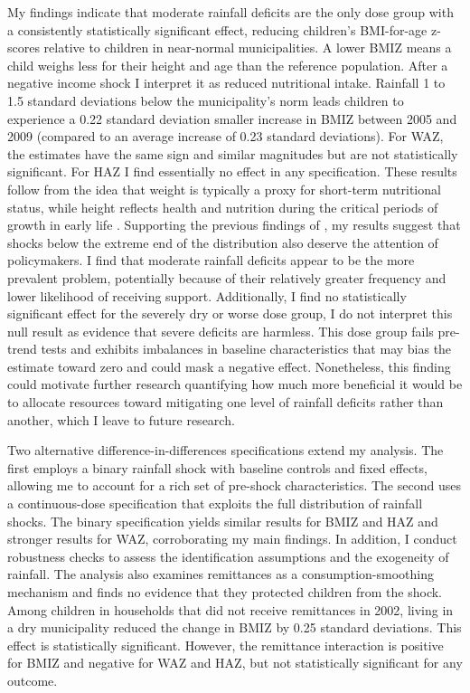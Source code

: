 \documentclass[12pt]{article}
\begin{document}
My findings indicate that moderate rainfall deficits are the only dose group with a consistently statistically significant effect, reducing children's BMI-for-age z-scores relative to children in near-normal municipalities. A lower BMIZ means a child weighs less for their height and age than the reference population. After a negative income shock I interpret it as reduced nutritional intake. Rainfall 1 to 1.5 standard deviations below the municipality's norm leads children to experience a 0.22 standard deviation smaller increase in BMIZ between 2005 and 2009 (compared to an average increase of 0.23 standard deviations). For WAZ, the estimates have the same sign and similar magnitudes but are not statistically significant. For HAZ I find essentially no effect in any specification. These results follow from the idea that weight is typically a proxy for short-term nutritional status, while height reflects health and nutrition during the critical periods of growth in early life \parencite{currieEarlyLifeHealthAdult2013}. Supporting the previous findings of \textcite{almondChildhoodCircumstancesAdult2018}, my results suggest that shocks below the extreme end of the distribution also deserve the attention of policymakers. I find that moderate rainfall deficits appear to be the more prevalent problem, potentially because of their relatively greater frequency and lower likelihood of receiving support. Additionally, I find no statistically significant effect for the severely dry or worse dose group, I do not interpret this null result as evidence that severe deficits are harmless. This dose group fails pre-trend tests and exhibits imbalances in baseline characteristics that may bias the estimate toward zero and could mask a negative effect. Nonetheless, this finding could motivate further research quantifying how much more beneficial it would be to allocate resources toward mitigating one level of rainfall deficits rather than another, which I leave to future research.

Two alternative difference-in-differences specifications extend my analysis. The first employs a binary rainfall shock with baseline controls and fixed effects, allowing me to account for a rich set of pre-shock characteristics. The second uses a continuous-dose specification that exploits the full distribution of rainfall shocks. The binary specification yields similar results for BMIZ and HAZ and stronger results for WAZ, corroborating my main findings. In addition, I conduct robustness checks to assess the identification assumptions and the exogeneity of rainfall. The analysis also examines remittances as a consumption-smoothing mechanism and finds no evidence that they protected children from the shock. Among children in households that did not receive remittances in 2002, living in a dry municipality reduced the change in BMIZ by 0.25 standard deviations. This effect is statistically significant. However, the remittance interaction is positive for BMIZ and negative for WAZ and HAZ, but not statistically significant for any outcome.
\end{document}
